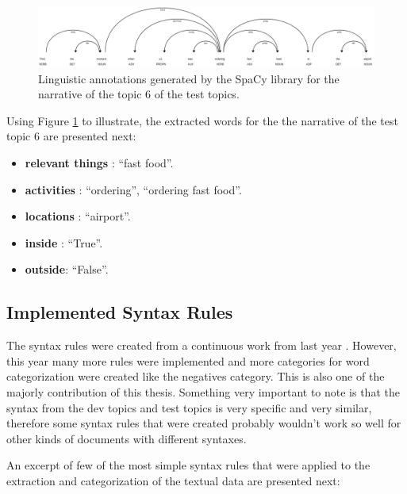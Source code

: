 \begin{figure}[H]
    \centering
    \captionsetup{justification=centering}
    \includegraphics[width =  \textwidth]{Sections/6textprocessing/images/spacy.png}
    \caption[SpaCy linguistic annotations generated]{Linguistic annotations generated by the SpaCy library \cite{Spacy2017} for the narrative of the topic 6 of the test topics.}
    \label{fig:spacy_labels}
  \end{figure}

 \newpage
Using Figure \ref{fig:spacy_labels} to illustrate, the extracted words for the the narrative of the test topic 6 are presented next:

    \begin{itemize}
      \itemsep0em
        \item \textbf{relevant things} : \enquote{fast food}.
        \item \textbf{activities} : \enquote{ordering}, \enquote{ordering fast food}.
        \item \textbf{locations} : \enquote{airport}.
        \item \textbf{inside} : \enquote{True}.
        \item \textbf{outside}: \enquote{False}.
       
    \end{itemize}

  \subsection{Implemented Syntax Rules}
  The syntax rules were created from a continuous work from last year \cite{Ribeiro2019}. However, this year many more rules were implemented and more categories for word categorization were created like the negatives category. This is also one of the majorly contribution of this thesis. Something very important to note is that the syntax from the dev topics and test topics is very specific and very similar, therefore some syntax rules that were created probably wouldn't work so well for other kinds of documents with different syntaxes.

  An excerpt of few of the most simple syntax rules that were applied to the extraction and categorization of the textual data are presented next:
  
